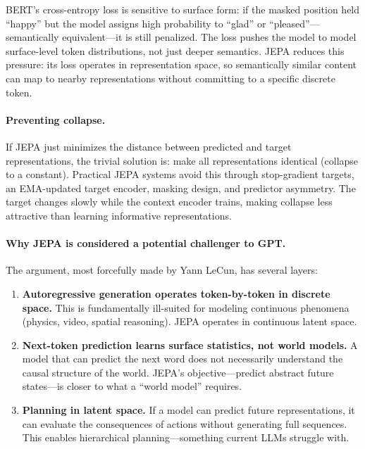 BERT's cross-entropy loss is sensitive to surface form: if the masked position held ``happy'' but the model assigns high probability to ``glad'' or ``pleased''---semantically equivalent---it is still penalized. The loss pushes the model to model surface-level token distributions, not just deeper semantics. JEPA reduces this pressure: its loss operates in representation space, so semantically similar content can map to nearby representations without committing to a specific discrete token.

\paragraph{Preventing collapse.} If JEPA just minimizes the distance between predicted and target representations, the trivial solution is: make all representations identical (collapse to a constant). Practical JEPA systems avoid this through stop-gradient targets, an EMA-updated target encoder, masking design, and predictor asymmetry. The target changes slowly while the context encoder trains, making collapse less attractive than learning informative representations.

\paragraph{Why JEPA is considered a potential challenger to GPT.}

The argument, most forcefully made by Yann LeCun, has several layers:

\begin{enumerate}[nosep]
  \item \textbf{Autoregressive generation operates token-by-token in discrete space.} This is fundamentally ill-suited for modeling continuous phenomena (physics, video, spatial reasoning). JEPA operates in continuous latent space.
  \item \textbf{Next-token prediction learns surface statistics, not world models.} A model that can predict the next word does not necessarily understand the causal structure of the world. JEPA's objective---predict abstract future states---is closer to what a ``world model'' requires.
  \item \textbf{Planning in latent space.} If a model can predict future representations, it can evaluate the consequences of actions without generating full sequences. This enables hierarchical planning---something current LLMs struggle with.
\end{enumerate}

